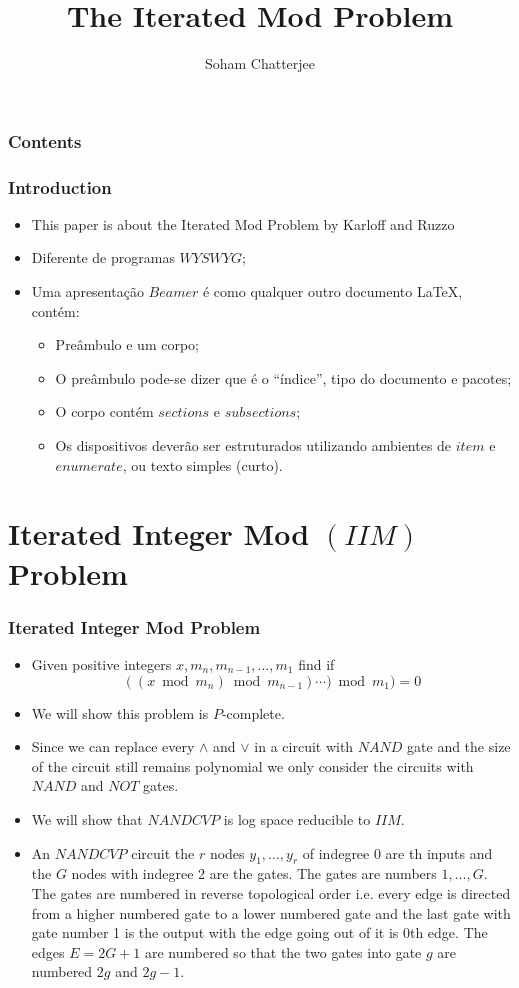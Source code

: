 \documentclass[article,8pt]{beamer}%
\title{The Iterated Mod Problem}
\author{Soham Chatterjee}
\institute{Chennai Mathematical Institute}
\begin{document}
\maketitle


\begin{frame}
    \frametitle{Contents}
    \tableofcontents
\end{frame}



\begin{frame}
    \frametitle{Introduction}
\begin{itemize}
    \item This paper is about the Iterated Mod Problem by Karloff and Ruzzo \cite{iteratedmod}
    \item  Diferente de programas $WYSWYG$;
    \item  Uma apresentação $Beamer$ é como qualquer outro documento LaTeX, contém:
    \begin{itemize}
        \item Preâmbulo e um corpo;
        \item O preâmbulo pode-se dizer que é o ``índice'', tipo do documento e pacotes;
        \item O corpo contém $sections$ e $subsections$;
        \item Os dispositivos deverão ser estruturados utilizando ambientes de $item$ e $enumerate$, ou texto simples (curto).
\end{itemize} 
\end{itemize}
\end{frame}
\section{Iterated Integer Mod $(IIM)$ Problem}
\begin{frame}
	\frametitle{Iterated Integer Mod Problem}
	\begin{itemize}
		\item Given positive integers $x, m_n,m_{n-1},\dots, m_1$  find if $$((x\bmod{m_{n}})\bmod{m_{n-1}})\cdots)\bmod{m_{1}})=0$$
		\item We will show this problem is $P$-complete.
		\item Since we can replace every $\wedge$ and $\vee$ in a circuit with $NAND$ gate and the size of the circuit still remains polynomial we only consider the circuits with $NAND$ and $NOT$ gates.
		\item We will show that $NANDCVP$ is log space reducible to $IIM$.
		\item An $NANDCVP$ circuit the $r$ nodes $y_1,\dots, y_r$ of indegree 0 are th inputs and the $G$ nodes  with indegree 2 are the gates. The gates are numbers $1,\dots, G$. The gates are numbered in reverse topological order i.e. every edge is directed from a higher numbered gate to a lower numbered gate and the last gate with gate number 1 is the output with the edge going out of it is 0th edge.  The edges $E=2G+1$ are numbered so that the two gates into gate $g$ are numbered $2g $ and $2g-1$.
	\end{itemize}
\end{frame}
\end{document}
